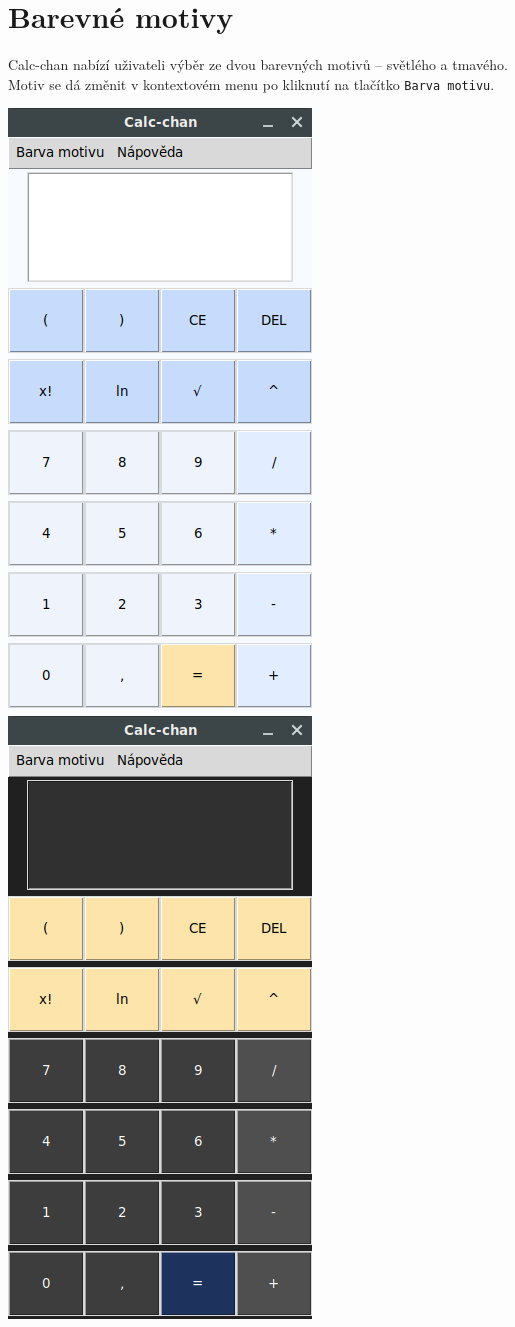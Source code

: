 \documentclass[a4paper, 11pt]{article}
\begin{document}
\section{Barevné motivy}
Calc-chan nabízí uživateli výběr ze dvou barevných motivů -- světlého a tmavého. Motiv se dá změnit v kontextovém menu po kliknutí na tlačítko \texttt{Barva motivu}.\\
\begin{center}
\includegraphics[scale=0.5]{screenshot.png}
\hspace{50pt}
\includegraphics[scale=0.5]{screenshot2.png}
\end{center}
\end{document}

